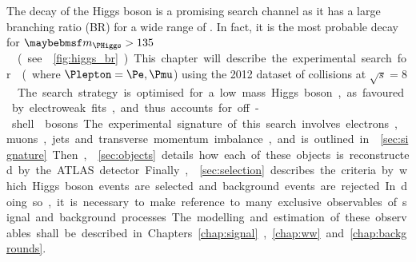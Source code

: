 
The \WW decay of the Higgs boson is a promising search channel as it has a large branching 
ratio (BR) for a wide range of \mH. In fact, it is the most probable decay for 
\unit{$\mH > 135$}{\GeV} (see \Figure~\ref{fig:higgs_br}). This chapter will describe the 
experimental search for \ggHWWlvlv (where $\Plepton = \Pe, \Pmu$) using the 2012 dataset 
of \pp collisions at \unit{$\sqrt{s} = 8$}{\TeV}. The search strategy is optimised for a 
low mass Higgs boson, as favoured by electroweak fits, and thus accounts for off-shell \PW 
bosons.

The experimental signature of this search involves electrons, muons, jets and transverse 
momentum imbalance, and is 
outlined in \Section~\ref{sec:signature}. Then, \Section~\ref{sec:objects} details how 
each of these objects is reconstructed by the ATLAS detector. Finally, 
\Section~\ref{sec:selection} describes the criteria by which Higgs boson events are 
selected and background events are rejected. In doing so, it is necessary to make 
reference to many exclusive observables of signal and background processes. 
The modelling and estimation of these observables shall be described in 
Chapters~\ref{chap:signal}, \ref{chap:ww} and \ref{chap:backgrounds}.
